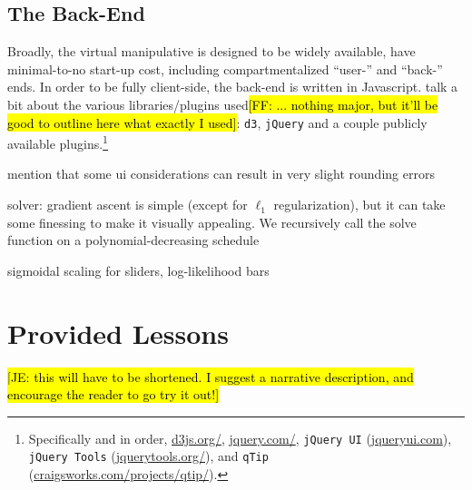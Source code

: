 \documentclass[11pt,letterpaper]{article}
\newcommand{\Note}[1]{}
\renewcommand{\Note}[1]{\hl{[#1]}}
\newcommand{\NoteSigned}[3]{{\sethlcolor{#2}\Note{#1: #3}}}
\newcommand{\NoteFF}[1]{\NoteSigned{FF}{LightBlue}{#1}}
\newcommand{\NoteJE}[1]{\NoteSigned{JE}{LightGreen}{#1}}
\begin{document}

\subsection{The Back-End}
Broadly, the virtual manipulative is designed to be widely available, have minimal-to-no start-up cost, including compartmentalized ``user-'' and ``back-'' ends. In order to be fully client-side, the back-end is written in Javascript. talk a bit about the various libraries/plugins used\NoteFF{... nothing major, but it'll be good to outline here what exactly I used}: \texttt{d3}, \texttt{jQuery} and a couple publicly available plugins.\footnote{Specifically and in order, 
\url{d3js.org/},
\url{jquery.com/}, 
\texttt{jQuery UI} (\url{jqueryui.com}),
\texttt{jQuery Tools} (\url{jquerytools.org/}), and
\texttt{qTip} (\url{craigsworks.com/projects/qtip/}).}

mention that some ui considerations can result in very slight rounding errors

solver: gradient ascent is simple (except for $\ell_1$ regularization), but it can take some finessing to make it visually appealing. We recursively call the solve function on a polynomial-decreasing schedule

sigmoidal scaling for sliders, log-likelihood bars

\section{Provided Lessons}\label{sec:lessons}

\NoteJE{this will have to be shortened.  I suggest a narrative
  description, and encourage the reader to go try it out!}
\end{document}
